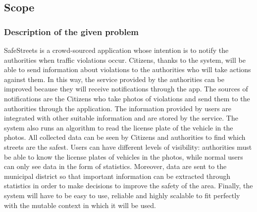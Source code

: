\subsection{Scope}
\subsubsection{Description of the given problem}
SafeStreets is a crowd-sourced application whose intention is to notify the authorities when traffic
violations occur. Citizens, thanks to the system, will be able to send information about violations to the
authorities who will take actions against them. In this way, the service provided by the authorities can be
improved because they will receive notifications through the app. The sources of notifications are the
Citizens who take photos of violations and send them to the authorities through
the application. The information provided by users are integrated with other suitable information and are
stored by the service. The system also runs an algorithm to read the license plate of the vehicle in the
photos. All collected data can be seen by Citizens and authorities to find which streets are the safest.
Users can have different levels of visibility: authorities must be able to know the license plates of vehicles
in the photos, while normal users can only see data in the form of statistics. Moreover, data are sent to
the municipal district so that important information can be extracted through statistics in order to make
decisions to improve the safety of the area. Finally, the system will have to be easy to use, reliable
and highly scalable to fit perfectly with the mutable context in which it will be used.

